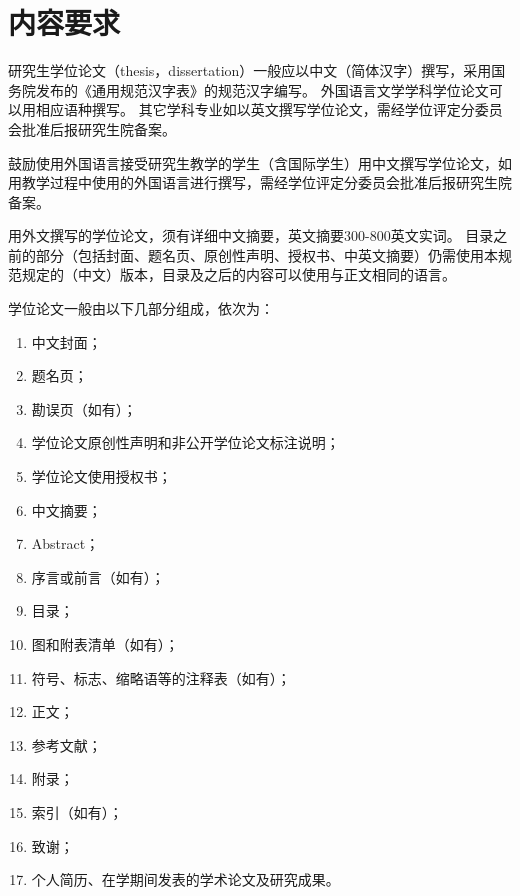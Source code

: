 \chapter{内容要求}

研究生学位论文（thesis，dissertation）一般应以中文（简体汉字）撰写，采用国务院发布的《通用规范汉字表》的规范汉字编写。
外国语言文学学科学位论文可以用相应语种撰写。
其它学科专业如以英文撰写学位论文，需经学位评定分委员会批准后报研究生院备案。

鼓励使用外国语言接受研究生教学的学生（含国际学生）用中文撰写学位论文，如用教学过程中使用的外国语言进行撰写，需经学位评定分委员会批准后报研究生院备案。

用外文撰写的学位论文，须有详细中文摘要，英文摘要300-800英文实词。
目录之前的部分（包括封面、题名页、原创性声明、授权书、中英文摘要）仍需使用本规范规定的（中文）版本，目录及之后的内容可以使用与正文相同的语言。

学位论文一般由以下几部分组成，依次为：

\begin{enumerate}
    \item 中文封面；
    \item 题名页；
    \item 勘误页（如有）；
    \item 学位论文原创性声明和非公开学位论文标注说明；
    \item 学位论文使用授权书；
    \item 中文摘要；
    \item Abstract；
    \item 序言或前言（如有）；
    \item 目录；
    \item 图和附表清单（如有）；
    \item 符号、标志、缩略语等的注释表（如有）；
    \item 正文；
    \item 参考文献；
    \item 附录；
    \item 索引（如有）；
    \item 致谢；
    \item 个人简历、在学期间发表的学术论文及研究成果。
\end{enumerate}
